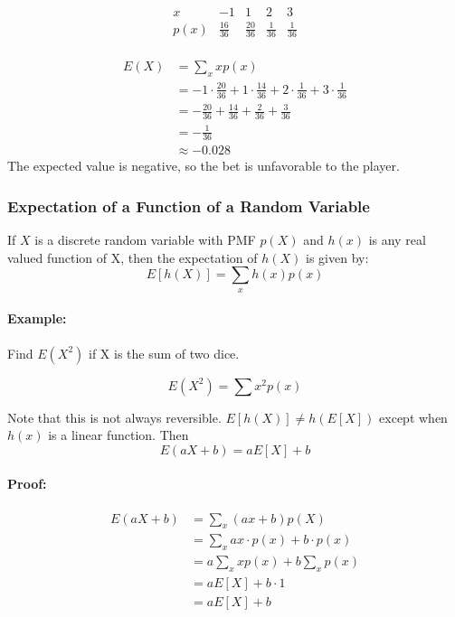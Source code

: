 \[
\begin{array}{c|c|c|c|c}
    x & -1 & 1 & 2 & 3 \\
    \hline
    p(x) & \frac{16}{36} & \frac{20}{36} & \frac{1}{36} & \frac{1}{36} \\
\end{array}
\]

\begin{align*}
    E(X) &= \sum_x x p(x) \\
    &= -1 \cdot \frac{20}{36} + 1 \cdot \frac{14}{36} + 2 \cdot \frac{1}{36} + 3 \cdot \frac{1}{36} \\
    &= -\frac{20}{36} + \frac{14}{36} + \frac{2}{36} + \frac{3}{36} \\
    &= -\frac{1}{36} \\
    &\approx -0.028
\end{align*}
The expected value is negative, so the bet is unfavorable to the player.

\subsubsection*{Expectation of a Function of a Random Variable}
\vspace{5mm}

If $X$ is a discrete random variable with PMF $p(X)$ and $h(x)$ is any real valued function of X, then the expectation of 
$h(X)$ is given by:
\[
    E[h(X)] = \sum_x h(x) p(x)
\]


\paragraph*{Example:}
Find $E(X^2)$ if X is the sum of two dice.

\[
    E(X^2) = \sum x^2 p(x) 
\]

\pagebreak

Note that this is not always reversible. $E[h(X)] \neq h(E[X])$ except when $h(x)$ is a linear function. Then 
\[
    E(aX + b) = aE[X] + b
\]

\paragraph*{Proof:}
\begin{align*}
    E(aX + b) &= \sum_x (ax + b)p(X) \\
    &= \sum_x ax \cdot p(x) + b \cdot p(x) \\
    &= a \sum_x x p(x) + b \sum_x p(x) \\
    &= aE[X] + b \cdot 1 \\
    &= aE[X] + b
\end{align*}

